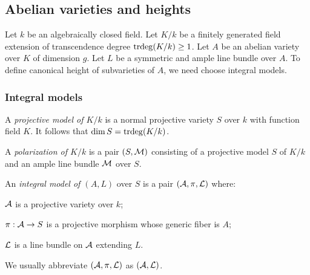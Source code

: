 \documentclass[12pt]{amsart}
\begin{document}
\subsection{Abelian varieties and heights}\label{par:1.1.1}
 
Let $k$ be an algebraically closed field.
Let $K/k$ be a finitely generated field extension of transcendence degree ${\mathrm{trdeg}}(K/k)\geq 1$.
Let $A$ be an abelian variety over $K$ of dimension $g$. 
Let $L$ be a symmetric and ample line bundle over $A$.
To define canonical height of subvarieties of $A$, we need choose integral models. 

\subsubsection{Integral models} \label{sectioncanheight}

A \emph{projective model of $K/k$} is a normal projective variety $S$ over $k$ with function field $K$.
It follows that $\dim S={\mathrm{trdeg}}(K/k)$.

A \emph{polarization of $K/k$} is a pair $(S, {\mathcal M})$ consisting of a projective model $S$ of $K/k$ and an ample line bundle ${\mathcal M}$ over $S$. 

An \emph{integral model of $(A,L)$} over $S$ is a pair $({\mathcal A}, \pi, {\mathcal L})$ where: 
\begin{points}
\item[$\bullet$] ${\mathcal A}$ is a projective variety over $k$;
\item[$\bullet$] $\pi: {\mathcal A}\to S$ is a projective morphism whose generic fiber is $A$;
\item[$\bullet$] ${\mathcal L}$ is a line bundle on ${\mathcal A}$ extending $L$.
\end{points}
We usually abbreviate $({\mathcal A}, \pi, {\mathcal L})$ as $({\mathcal A}, {\mathcal L})$.
\end{document}
